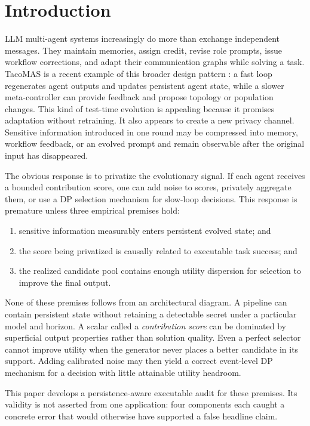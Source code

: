 \documentclass{article}
\begin{document}
\section{Introduction}

LLM multi-agent systems increasingly do more than exchange independent messages. They maintain memories, assign credit, revise role prompts, issue workflow corrections, and adapt their communication graphs while solving a task. TacoMAS is a recent example of this broader design pattern \citep{xu2026tacomas}: a fast loop regenerates agent outputs and updates persistent agent state, while a slower meta-controller can provide feedback and propose topology or population changes. This kind of test-time evolution is appealing because it promises adaptation without retraining. It also appears to create a new privacy channel. Sensitive information introduced in one round may be compressed into memory, workflow feedback, or an evolved prompt and remain observable after the original input has disappeared.

The obvious response is to privatize the evolutionary signal. If each agent receives a bounded contribution score, one can add noise to scores, privately aggregate them, or use a DP selection mechanism for slow-loop decisions. This response is premature unless three empirical premises hold:

\begin{enumerate}
  \item sensitive information measurably enters persistent evolved state; and
  \item the score being privatized is causally related to executable task success; and
  \item the realized candidate pool contains enough utility dispersion for selection to improve the final output.
\end{enumerate}

None of these premises follows from an architectural diagram. A pipeline can contain persistent state without retaining a detectable secret under a particular model and horizon. A scalar called a \emph{contribution score} can be dominated by superficial output properties rather than solution quality. Even a perfect selector cannot improve utility when the generator never places a better candidate in its support. Adding calibrated noise may then yield a correct event-level DP mechanism for a decision with little attainable utility headroom.

This paper develops a persistence-aware executable audit for these premises. Its validity is not asserted from one application: four components each caught a concrete error that would otherwise have supported a false headline claim.
\end{document}
